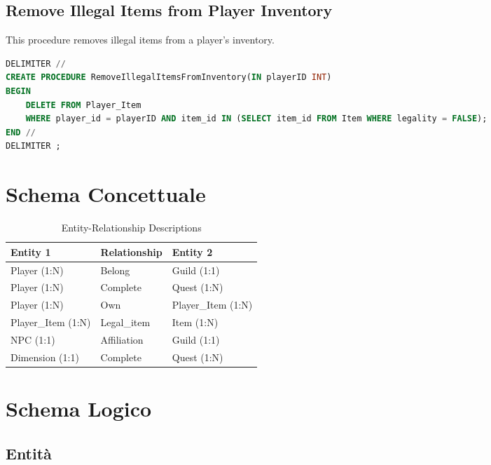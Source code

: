 \documentclass{article}
\begin{document}
\subsection{Remove Illegal Items from Player Inventory}
This procedure removes illegal items from a player's inventory.
\begin{lstlisting}[language=sql,caption=Remove Illegal Items from Player Inventory]
DELIMITER //
CREATE PROCEDURE RemoveIllegalItemsFromInventory(IN playerID INT)
BEGIN
    DELETE FROM Player_Item
    WHERE player_id = playerID AND item_id IN (SELECT item_id FROM Item WHERE legality = FALSE);
END //
DELIMITER ;
\end{lstlisting}

\section{Schema Concettuale}

\begin{table}[h!]
\raggedright
\begin{tabular}{|l|l|l|}
\hline
\textbf{Entity 1} & \textbf{Relationship} & \textbf{Entity 2} \\ \hline
Player (1:N) & Belong & Guild (1:1) \\ \hline
Player (1:N) & Complete & Quest (1:N) \\ \hline
Player (1:N) & Own & Player\_Item (1:N) \\ \hline
Player\_Item (1:N) & Legal\_item & Item (1:N) \\ \hline
NPC (1:1) & Affiliation & Guild (1:1) \\ \hline
Dimension (1:1) & Complete & Quest (1:N) \\ \hline
\end{tabular}
\caption{Entity-Relationship Descriptions}
\end{table}

\section{Schema Logico}

\subsection{Entità}
\end{document}
